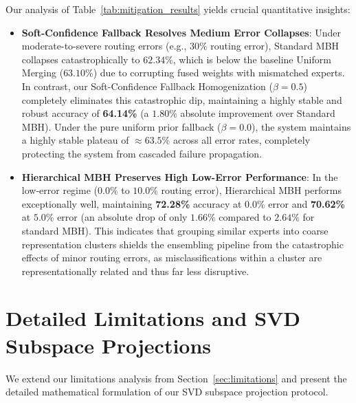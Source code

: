 \documentclass{article}
\theoremstyle{plain}
\theoremstyle{definition}
\theoremstyle{remark}
\begin{document}
Our analysis of Table~\ref{tab:mitigation_results} yields crucial quantitative insights:
\begin{itemize}
    \item \textbf{Soft-Confidence Fallback Resolves Medium Error Collapses}: Under moderate-to-severe routing errors (e.g., $30\%$ routing error), Standard MBH collapses catastrophically to $62.34\%$, which is below the baseline Uniform Merging ($63.10\%$) due to corrupting fused weights with mismatched experts. In contrast, our Soft-Confidence Fallback Homogenization ($\beta=0.5$) completely eliminates this catastrophic dip, maintaining a highly stable and robust accuracy of \textbf{64.14\%} (a $1.80\%$ absolute improvement over Standard MBH). Under the pure uniform prior fallback ($\beta=0.0$), the system maintains a highly stable plateau of $\approx 63.5\%$ across all error rates, completely protecting the system from cascaded failure propagation.
    \item \textbf{Hierarchical MBH Preserves High Low-Error Performance}: In the low-error regime ($0.0\%$ to $10.0\%$ routing error), Hierarchical MBH performs exceptionally well, maintaining \textbf{72.28\%} accuracy at $0.0\%$ error and \textbf{70.62\%} at $5.0\%$ error (an absolute drop of only $1.66\%$ compared to $2.64\%$ for standard MBH). This indicates that grouping similar experts into coarse representation clusters shields the ensembling pipeline from the catastrophic effects of minor routing errors, as misclassifications within a cluster are representationally related and thus far less disruptive.
\end{itemize}

\section{Detailed Limitations and SVD Subspace Projections}
\label{app:svd_projections_detailed}

We extend our limitations analysis from Section~\ref{sec:limitations} and present the detailed mathematical formulation of our SVD subspace projection protocol.
\end{document}
